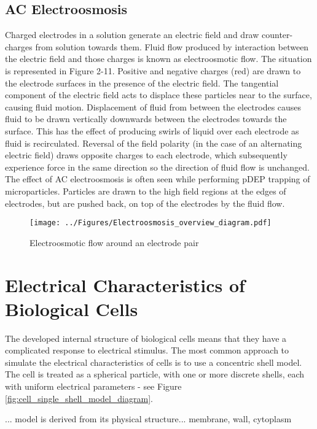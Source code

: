 \subsection{AC Electroosmosis}
Charged electrodes in a solution generate an electric field and draw counter-charges from solution towards them. Fluid flow produced by interaction between the electric field and those charges is known as electroosmotic flow. The situation is represented in Figure 2-11. Positive and negative charges (red) are drawn to the electrode surfaces in the presence of the electric field. The tangential component of the electric field acts to displace these particles near to the surface, causing fluid motion. Displacement of fluid from between the electrodes causes fluid to be drawn vertically downwards between the electrodes towards the surface. This has the effect of producing swirls of liquid over each electrode as fluid is recirculated. Reversal of the field polarity (in the case of an alternating electric field) draws opposite charges to each electrode, which subsequently experience force in the same direction so the direction of fluid flow is unchanged. The effect of AC electroosmosis is often seen while performing pDEP trapping of microparticles. Particles are drawn to the high field regions at the edges of electrodes, but are pushed back, on top of the electrodes by the fluid flow.

\begin{figure}
 \centering
 \texttt{[image: ../Figures/Electroosmosis\_overview\_diagram.pdf]}
 \caption{Electroosmotic flow around an electrode pair}
 \label{fig:Electroosmosis_overview_diagram}
\end{figure}

\section{Electrical Characteristics of Biological Cells}
\label{sec:electrical_characteristics_of_biological_cells}
The developed internal structure of biological cells means that they have a complicated response to electrical stimulus. The most common approach to simulate the electrical characteristics of cells is to use a concentric shell model. The cell is treated as a spherical particle, with one or more discrete shells, each with uniform electrical parameters - see Figure \ref{fig:cell_single_shell_model_diagram}.

... model is derived from its physical structure... membrane, wall, cytoplasm

